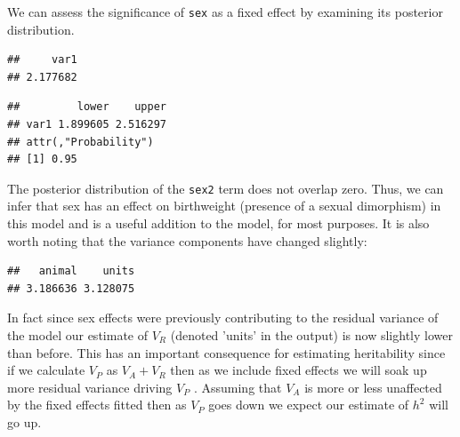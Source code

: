 \documentclass[
  12pt,
]{book}
\newenvironment{Shaded}{\begin{snugshade}}{\end{snugshade}}
\newcommand{\FloatTok}[1]{\textcolor[rgb]{0.00,0.00,0.81}{#1}}
\newcommand{\KeywordTok}[1]{\textcolor[rgb]{0.13,0.29,0.53}{\textbf{#1}}}
\newcommand{\NormalTok}[1]{#1}
\newcommand{\OperatorTok}[1]{\textcolor[rgb]{0.81,0.36,0.00}{\textbf{#1}}}
\newcommand{\StringTok}[1]{\textcolor[rgb]{0.31,0.60,0.02}{#1}}
\begin{document}
We can assess the significance of \texttt{sex} as a fixed effect by examining its posterior distribution.

\begin{Shaded}
\end{Shaded}

\begin{verbatim}
##     var1 
## 2.177682
\end{verbatim}

\begin{Shaded}
\end{Shaded}

\begin{verbatim}
##         lower    upper
## var1 1.899605 2.516297
## attr(,"Probability")
## [1] 0.95
\end{verbatim}

The posterior distribution of the \texttt{sex2} term does not overlap zero. Thus, we can infer that sex has an effect on birthweight (presence of a sexual dimorphism) in this model and is a useful addition to the model, for most purposes. It is also worth noting that the variance components have changed slightly:

\begin{Shaded}
\end{Shaded}

\begin{verbatim}
##   animal    units 
## 3.186636 3.128075
\end{verbatim}

In fact since sex effects were previously contributing to the residual variance of the model our estimate of \(V_R\) (denoted 'units' in the output) is now slightly lower than before. This has an important consequence for estimating heritability since if we calculate \(V_P\) as \(V_A +V_R\) then as we include fixed effects we will soak up more residual variance driving \(V_P\) . Assuming that \(V_A\) is more or less unaffected by the fixed effects fitted then as \(V_P\) goes down we expect our estimate of \(h^2\) will go up.
\end{document}
